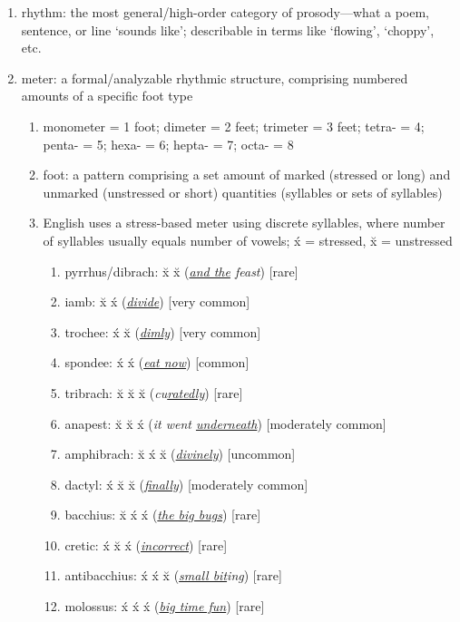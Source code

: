 \documentclass[12pt]{article}
\begin{document}
\begin{enumerate}
\item rhythm: the most general/high-order category of prosody---what a poem, sentence, or line `sounds like'; describable in terms like `flowing', `choppy', etc.
\item meter: a formal/analyzable rhythmic structure, comprising numbered amounts of a specific foot type
    \begin{enumerate}
    \item monometer = 1 foot; dimeter = 2 feet; trimeter = 3 feet; tetra- = 4; penta- = 5; hexa- = 6; hepta- = 7; octa- = 8
    \item foot: a pattern comprising a set amount of marked (stressed or long) and unmarked (unstressed or short) quantities (syllables or sets of syllables)
    \item English uses a stress-based meter using discrete syllables, where number of syllables usually equals number of vowels; \'{x} = stressed, \u{x} = unstressed
        \begin{enumerate}
        \item pyrrhus/dibrach: \u{x} \u{x} (\textit{\underline{and the} feast}) [rare]
        \item iamb: \u{x} \'{x} (\textit{\underline{divide}}) [very common]
        \item trochee: \'{x} \u{x} (\textit{\underline{dimly}}) [very common]
        \item spondee: \'{x} \'{x} (\textit{\underline{eat now}}) [common]
        \item tribrach: \u{x} \u{x} \u{x} (\textit{cu\underline{ratedly}}) [rare]
        \item  anapest: \u{x} \u{x} \'{x} (\textit{it went \underline{underneath}}) [moderately common]
        \item amphibrach: \u{x} \'{x} \u{x} (\textit{\underline{divinely}}) [uncommon]
        \item dactyl: \'{x} \u{x} \u{x} (\textit{\underline{finally}}) [moderately common]
        \item bacchius: \u{x} \'{x} \'{x} (\textit{\underline{the big bugs}}) [rare]
        \item cretic: \'{x} \u{x} \'{x} (\textit{\underline{incorrect}}) [rare]
        \item antibacchius: \'{x} \'{x} \u{x} (\textit{\underline{small bit}ing}) [rare]
        \item molossus: \'{x} \'{x} \'{x} (\textit{\underline{big time fun}}) [rare]

\end{enumerate}
\end{enumerate}
\end{enumerate}
\end{document}
